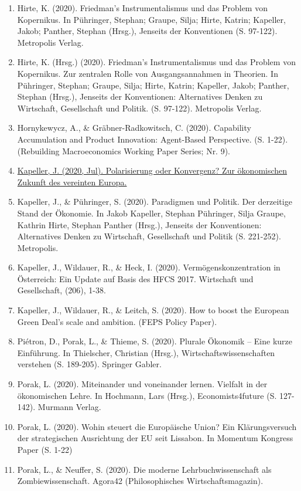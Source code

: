 \begin{enumerate}
	 \item Hirte, K. (2020). Friedman’s Instrumentalismus und das Problem von Kopernikus. In Pühringer, Stephan; Graupe, Silja; Hirte, Katrin; Kapeller, Jakob; Panther, Stephan (Hrsg.), Jenseits der Konventionen (S. 97-122). Metropolis Verlag.
	 \item Hirte, K. (Hrsg.) (2020). Friedman’s Instrumentalismus und das Problem von Kopernikus. Zur zentralen Rolle von Ausgangsannahmen in Theorien. In Pühringer, Stephan; Graupe, Silja; Hirte, Katrin; Kapeller, Jakob; Panther, Stephan (Hrsg.), Jenseits der Konventionen: Alternatives Denken zu Wirtschaft, Gesellschaft und Politik. (S. 97-122). Metropolis Verlag.
	 \item Hornykewycz, A., \& Gräbner-Radkowitsch, C. (2020). Capability Accumulation and Product Innovation: Agent-Based Perspective. (S. 1-22). (Rebuilding Macroeconomics Working Paper Series; Nr. 9).
	 \item \href{https://www.fes.de/news/polarisierung-oder-konvergenz-zur-oekonomischen-zukunft-des-vereinten-europa}{Kapeller, J. (2020, Jul). Polarisierung oder Konvergenz? Zur ökonomischen Zukunft des vereinten Europa.}
	 \item Kapeller, J., \& Pühringer, S. (2020). Paradigmen und Politik. Der derzeitige Stand der Ökonomie. In Jakob Kapeller, Stephan Pühringer, Silja Graupe, Kathrin Hirte, Stephan Panther (Hrsg.), Jenseits der Konventionen: Alternatives Denken zu Wirtschaft, Gesellschaft und Politik (S. 221-252). Metropolis.
	 \item Kapeller, J., Wildauer, R., \& Heck, I. (2020). Vermögenskonzentration in Österreich: Ein Update auf Basis des HFCS 2017. Wirtschaft und Gesellschaft, (206), 1-38.
	 \item Kapeller, J., Wildauer, R., \& Leitch, S. (2020). How to boost the European Green Deal’s scale and ambition. (FEPS Policy Paper).
	 \item Piétron, D., Porak, L., \& Thieme, S. (2020). Plurale Ökonomik -- Eine kurze Einführung. In Thielscher, Christian (Hrsg.), Wirtschaftswissenschaften verstehen (S. 189-205). Springer Gabler.
	 \item Porak, L. (2020). Miteinander und voneinander lernen. Vielfalt in der ökonomischen Lehre. In Hochmann, Lars (Hrsg.), Economists4future (S. 127-142). Murmann Verlag.
	 \item Porak, L. (2020). Wohin steuert die Europäische Union? Ein Klärungsversuch der strategischen Ausrichtung der EU seit Lissabon. In Momentum Kongress Paper (S. 1-22)
	 \item Porak, L., \& Neuffer, S. (2020). Die moderne Lehrbuchwissenschaft als Zombiewissenschaft. Agora42 (Philosophisches Wirtschaftsmagazin).

\end{enumerate}
